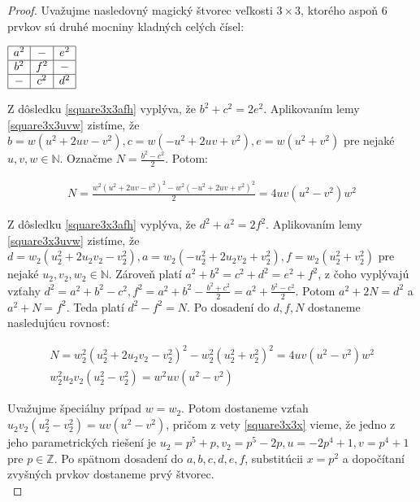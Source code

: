 \begin{proof} 
Uvažujme nasledovný magický štvorec veľkosti $3 \times 3$, ktorého aspoň $6$ prvkov sú druhé mocniny kladných celých čísel: \\

\begin{center}
$\begin{array}{ |c|c|c| } 
\hline
a^2 & - & e^2 \\ 
\hline
b^2 & f^2 & - \\ 
\hline
- & c^2 & d^2 \\
\hline
\end{array}$
\end{center}

Z dôsledku \ref{square3x3afh} vyplýva, že $b^2 + c^2 = 2e^2$. Aplikovaním lemy \ref{square3x3uvw} zistíme, že $b = w(u^2 + 2uv - v^2), c = w(- u^2 + 2uv + v^2), e = w(u^2 + v^2)$ pre nejaké $u,v,w \in \mathbb{N}$. Označme $N = \frac{b^2 - c^2}{2}$. Potom:

\begin{gather*}
N = \frac{w^2(u^2 + 2uv - v^2)^2 - w^2(- u^2 + 2uv + v^2)^2}{2} = 4uv(u^2 - v^2)w^2
\end{gather*}

Z dôsledku \ref{square3x3afh} vyplýva, že $d^2 + a^2 = 2f^2$. Aplikovaním lemy \ref{square3x3uvw} zistíme, že $d = w_2(u_2^2 + 2u_2 v_2 - v_2^2), a = w_2(- u_2^2 + 2u_2 v_2 + v_2^2), f = w_2(u_2^2 + v_2^2)$ pre nejaké $u_2,v_2,w_2 \in \mathbb{N}$. Zároveň platí $a^2 + b^2 = c^2 + d^2 = e^2 + f^2$, z čoho vyplývajú vzťahy $d^2 = a^2 + b^2 - c^2, f^2 = a^2 + b^2 - \frac{b^2 + c^2}{2} = a^2 + \frac{b^2 - c^2}{2}$.  Potom $a^2 + 2N = d^2$ a $a^2 + N = f^2$. Teda platí $d^2 - f^2 = N$. Po dosadení do $d,f,N$ dostaneme nasledujúcu rovnosť:

\begin{gather*}
N = w_2^2(u_2^2 + 2u_2 v_2 - v_2^2)^2 - w_2^2(u_2^2 + v_2^2)^2 = 4u v(u^2 - v^2)w^2 \\
w_2^2 u_2 v_2 (u_2^2 - v_2^2) = w^2 uv (u^2 - v^2)
\end{gather*}
 
Uvažujme špeciálny prípad $w = w_2$. Potom dostaneme vzťah $u_2 v_2 (u_2^2 - v_2^2) = uv (u^2 - v^2)$, pričom z vety \ref{square3x3x} vieme, že jedno z jeho parametrických riešení je $u_2 = p^5 + p, v_2 = p^5 - 2p, u = -2p^4 + 1, v = p^4 + 1$ pre $p \in \mathbb{Z}$. Po spätnom dosadení do $a,b,c,d,e,f$, substitúcii $x = p^2$ a dopočítaní zvyšných prvkov dostaneme prvý štvorec. \\


\end{proof}
